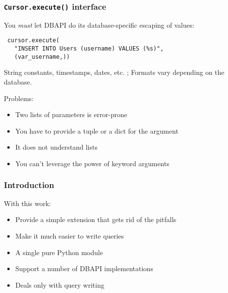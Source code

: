 \documentclass{beamer}
\begin{document}
\begin{frame}[fragile]
  \frametitle{\texttt{Cursor.execute()} interface}

  You \emph{must} let DBAPI do its database-specific escaping of values:
\begin{verbatim}
 cursor.execute(
   "INSERT INTO Users (username) VALUES (%s)",
   (var_username,))
\end{verbatim}

String constants, timestamps, dates, etc. ; Formats vary depending on the
database.

\pause
\vfill
Problems:
\begin{itemize}
\item Two lists of parameters is error-prone
\item You have to provide a tuple or a dict for the argument
\item It does not understand lists 
\item You can't leverage the power of keyword arguments
\end{itemize}

\end{frame}


\begin{frame}[fragile]
  \frametitle{Introduction}

\vfill
  With this work:
  \begin{itemize}
  \item Provide a simple extension that gets rid of the pitfalls
  \item Make it much easier to write queries
  \item A single pure Python module
  \item Support a number of DBAPI implementations
  \item Deals only with query writing
  \end{itemize}

\end{frame}
\end{document}
